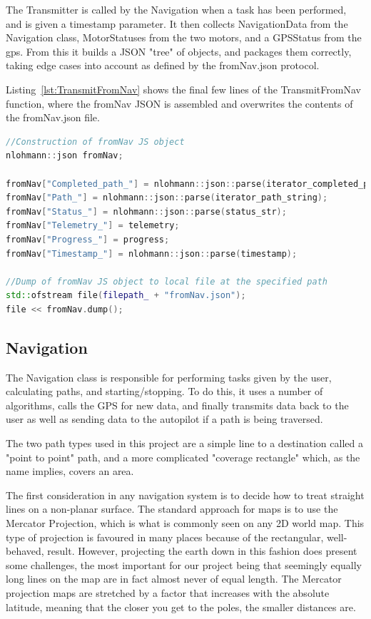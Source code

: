 The Transmitter is called by the Navigation when a task has been performed, and is given a timestamp parameter. It then collects NavigationData from the Navigation class, MotorStatuses from the two motors, and a GPSStatus from the gps. From this it builds a JSON "tree" of objects, and packages them correctly, taking edge cases into account as defined by the fromNav.json protocol. 

Listing~\ref{lst:TransmitFromNav} shows the final few lines of the TransmitFromNav function, where the fromNav JSON is assembled and overwrites the contents of the fromNav.json file.

\begin{lstlisting}[caption = {Last lines of the TransmitFromNav function in the Transmitter class}, captionpos=b, label={lst:TransmitFromNav}, language=C++,firstnumber=1]
//Construction of fromNav JS object
nlohmann::json fromNav;

fromNav["Completed_path_"] = nlohmann::json::parse(iterator_completed_path_string);
fromNav["Path_"] = nlohmann::json::parse(iterator_path_string);
fromNav["Status_"] = nlohmann::json::parse(status_str);
fromNav["Telemetry_"] = telemetry;
fromNav["Progress_"] = progress;
fromNav["Timestamp_"] = nlohmann::json::parse(timestamp);

//Dump of fromNav JS object to local file at the specified path
std::ofstream file(filepath_ + "fromNav.json");
file << fromNav.dump();
\end{lstlisting}

\subsection{Navigation}
The Navigation class is responsible for performing tasks given by the user, calculating paths, and starting/stopping. To do this, it uses a number of algorithms, calls the GPS for new data, and finally transmits data back to the user as well as sending data to the autopilot if a path is being traversed.

The two path types used in this project are a simple line to a destination called a "point to point" path, and a more complicated "coverage rectangle" which, as the name implies, covers an area.

The first consideration in any navigation system is to decide how to treat straight lines on a non-planar surface. The standard approach for maps is to use the Mercator Projection, which is what is commonly seen on any 2D world map. This type of projection is favoured in many places because of the rectangular, well-behaved, result. However, projecting the earth down in this fashion does present some challenges, the most important for our project being that seemingly equally long lines on the map are in fact almost never of equal length. The Mercator projection maps are stretched by a factor that increases with the absolute latitude, meaning that the closer you get to the poles, the smaller distances are.

